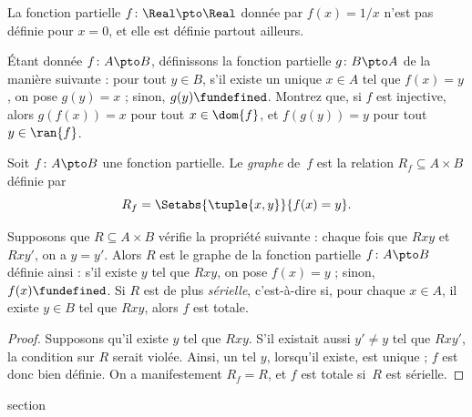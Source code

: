 \documentclass[11pt,a4paper,openany]{memoir}
\begin{document}
\begin{ex}
La fonction partielle $f\colon \Real \pto \Real$ donnée par $f(x) = 1/x$
n’est pas définie pour $x = 0$, et elle est définie partout ailleurs.
\end{ex}

\begin{prob}
Étant donnée $f\colon A \pto B$, définissons la fonction partielle
$g\colon B \pto A$ de la manière suivante : pour tout $y \in B$,
s’il existe un unique $x \in A$ tel que $f(x) = y$, on pose $g(y) = x$ ;
sinon, $g(y) \fundefined$. Montrez que, si $f$ est injective, alors
$g(f(x)) = x$ pour tout $x \in \dom{f}$, et $f(g(y)) = y$ pour tout
$y \in \ran{f}$.
\end{prob}

\begin{defn}
Soit $f\colon A \pto B$ une fonction partielle. Le \emph{graphe} de~$f$
est la relation $R_f \subseteq A \times B$ définie par
\[
R_f = \Setabs{\tuple{x,y}}{f(x) = y}.
\]
\end{defn}

\begin{prop}
Supposons que $R \subseteq A \times B$ vérifie la propriété suivante :
chaque fois que $Rxy$ et $Rxy'$, on a $y = y'$.
Alors $R$ est le graphe de la fonction partielle $f\colon A \pto B$
définie ainsi : s’il existe $y$ tel que $Rxy$, on pose $f(x) = y$ ;
sinon, $f(x) \fundefined$. Si $R$ est de plus \emph{sérielle},
c’est-à-dire si, pour chaque $x \in A$, il existe $y \in B$ tel que
$Rxy$, alors $f$ est totale.
\end{prop}

\begin{proof}
Supposons qu’il existe $y$ tel que $Rxy$. S’il existait aussi $y' \neq y$
tel que $Rxy'$, la condition sur $R$ serait violée. Ainsi, un tel $y$,
lorsqu’il existe, est unique ; $f$ est donc bien définie.
On a manifestement $R_f = R$, et $f$ est totale si~$R$ est sérielle.
\end{proof}


\endgroup


\OLEndChapterHook


\endgroup


\begingroup
\expandafter\def\csname ol@sectioncs\endcsname{section}
\def\olfilename{size-of-sets-complete}
\end{document}

